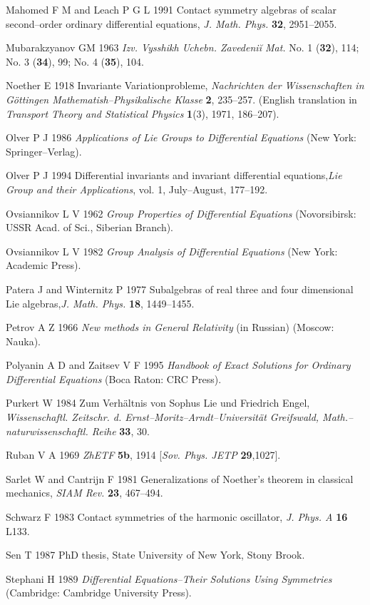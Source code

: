 Mahomed F M and Leach P G L 1991
Contact symmetry algebras of scalar
second--order ordinary differential equations, {\em J. Math. Phys.} {\bf 32},
2951--2055.

Mubarakzyanov GM  1963 {\em Izv. Vysshikh Uchebn. Zavedeni\u i Mat.}
No. 1 ({\bf 32}), 114; No. 3 ({\bf 34}), 99; No. 4 ({\bf 35}),
104.

Noether E 1918 Invariante Variationprobleme, {\em Nachrichten der
Wissenschaften in G\"ottingen Mathematish--Physikalische Klasse} {\bf 2},
235--257. (English translation in {\em Transport Theory and Statistical
Physics} {\bf 1}(3), 1971, 186--207).

Olver P J 1986 {\em Applications of Lie Groups to Differential Equations}
(New York: Springer--Verlag). 

Olver P J 1994  Differential invariants and invariant
differential equations,{\em  Lie Group and their Applications}, vol. 1,
July--August, 177--192.

Ovsiannikov L V 1962 {\em Group Properties of Differential Equations}
(Novorsibirsk: USSR Acad. of Sci., Siberian Branch).

Ovsiannikov L V 1982 {\em Group Analysis of Differential
Equations} (New York: Academic Press).

Patera J and Winternitz P  1977
Subalgebras of real three and four dimensional Lie algebras,{\em  J. Math.
Phys.} {\bf 18}, 1449--1455.
 
Petrov A Z 1966 {\em New methods in General Relativity}
(in Russian) (Moscow: Nauka).

Polyanin A D and Zaitsev V F  1995 {\em Handbook of Exact Solutions for Ordinary
Differential Equations} (Boca Raton: CRC Press).

Purkert W 1984  Zum Verh\"altnis von Sophus Lie und Friedrich Engel,
{\em Wissenschaftl. Zeitschr. d. Ernst--Moritz--Arndt--Universit\"at
Greifswald, Math.--naturwissenschaftl. Reihe} {\bf 33}, 30.

Ruban V A 1969 {\em ZhETF} {\bf5b}, 1914 [{\em Sov. Phys. JETP} {\bf29},1027].

Sarlet W and Cantrijn F 1981  Generalizations of Noether's theorem in
classical mechanics, {\em SIAM Rev.} {\bf 23}, 467--494.

Schwarz F 1983 Contact symmetries of the harmonic
oscillator, {\em J. Phys. A} {\bf 16} L133.

Sen T 1987  PhD thesis, State University of New York, Stony Brook.

Stephani H 1989 {\em Differential Equations--Their Solutions
Using Symmetries} (Cambridge: Cambridge University Press). 

